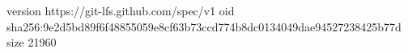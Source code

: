 version https://git-lfs.github.com/spec/v1
oid sha256:9e2d5bd89f6f48855059e8cf63b73ccd774b8dc0134049dae94527238425b77d
size 21960
